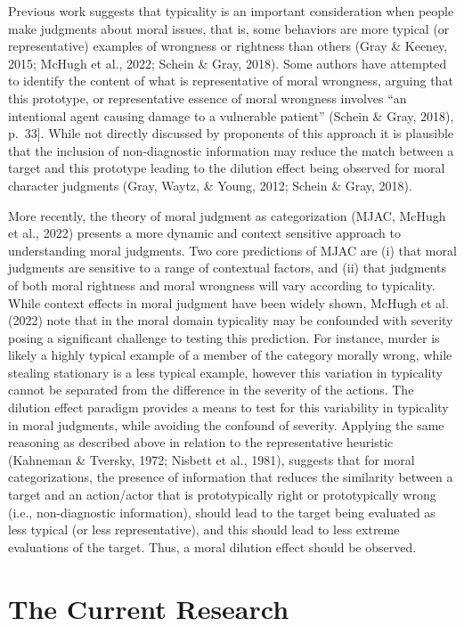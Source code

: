 \documentclass[
  man,floatsintext]{apa7}
\begin{document}
Previous work suggests that typicality is an important consideration when people make judgments about moral issues, that is, some behaviors are more typical (or representative) examples of wrongness or rightness than others (Gray \& Keeney, 2015; McHugh et al., 2022; Schein \& Gray, 2018). Some authors have attempted to identify the content of what is representative of moral wrongness, arguing that this prototype, or representative essence of moral wrongness involves ``an intentional agent causing damage to a vulnerable patient'' (Schein \& Gray, 2018), p.~33{]}. While not directly discussed by proponents of this approach it is plausible that the inclusion of non-diagnostic information may reduce the match between a target and this prototype leading to the dilution effect being observed for moral character judgments (Gray, Waytz, \& Young, 2012; Schein \& Gray, 2018).

More recently, the theory of moral judgment as categorization (MJAC, McHugh et al., 2022) presents a more dynamic and context sensitive approach to understanding moral judgments. Two core predictions of MJAC are (i) that moral judgments are sensitive to a range of contextual factors, and (ii) that judgments of both moral rightness and moral wrongness will vary according to typicality. While context effects in moral judgment have been widely shown, McHugh et al. (2022) note that in the moral domain typicality may be confounded with severity posing a significant challenge to testing this prediction. For instance, murder is likely a highly typical example of a member of the category morally wrong, while stealing stationary is a less typical example, however this variation in typicality cannot be separated from the difference in the severity of the actions. The dilution effect paradigm provides a means to test for this variability in typicality in moral judgments, while avoiding the confound of severity. Applying the same reasoning as described above in relation to the representative heuristic (Kahneman \& Tversky, 1972; Nisbett et al., 1981), suggests that for moral categorizations, the presence of information that reduces the similarity between a target and an action/actor that is prototypically right or prototypically wrong (i.e., non-diagnostic information), should lead to the target being evaluated as less typical (or less representative), and this should lead to less extreme evaluations of the target. Thus, a moral dilution effect should be observed.

\section{The Current Research}\label{the-current-research}
\end{document}
